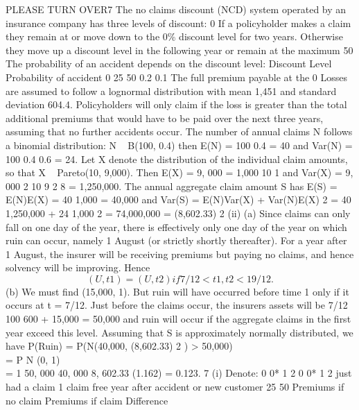 \documentclass[a4paper,12pt]{article}
\begin{document}
\begin{enumerate}
[Total 9]
PLEASE TURN OVER7
The no claims discount (NCD) system operated by an insurance company has three levels of discount: 0%
If a policyholder makes a claim they remain at or move down to the 0\% discount level
for two years. Otherwise they move up a discount level in the following year or remain at the maximum 50%
The probability of an accident depends on the discount level:
Discount Level Probability of accident
0%
25%
50%
0.2
0.1
The full premium payable at the 0%
Losses are assumed to follow a lognormal distribution with mean 1,451 and standard deviation 604.4.
Policyholders will only claim if the loss is greater than the total additional premiums that would have to be paid over the next three years, assuming that no further accidents occur.
The number of annual claims N follows a binomial distribution:
N ~ B(100, 0.4) then
E(N) = 100
0.4 = 40
and
Var(N) = 100
0.4
0.6 = 24.
Let X denote the distribution of the individual claim amounts, so that X ~
Pareto(10, 9,000). Then
E(X) =
9, 000
= 1,000
10 1
and
Var(X) =
9, 000 2 10
9 2 8
= 1,250,000.
The annual aggregate claim amount S has
E(S) = E(N)E(X) = 40
1,000 = 40,000
and
Var(S) = E(N)Var(X) + Var(N)E(X) 2
= 40
1,250,000 + 24
1,000 2
= 74,000,000
= (8,602.33) 2
(ii)
(a)
Since claims can only fall on one day of the year, there is effectively only one day of the year on which ruin can occur, namely 1 August (or strictly shortly thereafter). For a year after 1 August, the insurer will be receiving premiums but paying no claims, and hence solvency will be improving. Hence
\[(U, t 1 ) = (U, t 2 ) if 7/12 < t 1 , t 2 < 19/12.\]
(b)
We must find (15,000, 1). But ruin will have occurred before time 1
only if it occurs at t = 7/12. Just before the claims occur, the insurers assets will be 7/12 100 600 + 15,000 = 50,000 and ruin will occur if the aggregate claims in the first year exceed this level. Assuming that S is approximately normally distributed, we have
P(Ruin) = P(N(40,000, (8,602.33) 2 ) > 50,000)\\
= P N (0, 1)\\
= 1
50, 000 40, 000
8, 602.33
(1.162)
= 0.123.
7
(i)
Denote:
0
0*
1
2
0
0*
1
2
just had a claim
1 claim free year after accident or new customer
25%
50%
Premiums if no claim Premiums if claim Difference

\end{enumerate}
\end{document}
